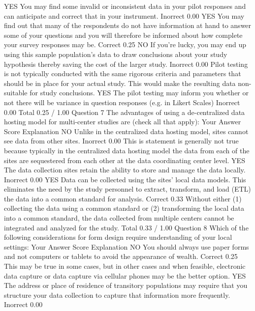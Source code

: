 YES You may find some invalid or inconsistent data in your pilot responses and can anticipate and correct that in your instrument.	Inorrect	0.00	
YES You may find out that many of the respondents do not have information at hand to answer some of your questions and you will therefore be informed about how complete your survey responses may be.	Correct	0.25	
NO If you're lucky, you may end up using this sample population's data to draw conclusions about your study hypothesis thereby saving the cost of the larger study.	Inorrect	0.00	Pilot testing is not typically conducted with the same rigorous criteria and parameters that should be in place for your actual study. This would make the resulting data non-suitable for study conclusions.
YES The pilot testing may inform you whether or not there will be variance in question responses (e.g. in Likert Scales)	Inorrect	0.00	
Total		0.25 / 1.00	
Question 7
The advantages of using a de-centralized data hosting model for multi-center studies are (check all that apply):
Your Answer		Score	Explanation
NO Unlike in the centralized data hosting model, sites cannot see data from other sites.	Inorrect	0.00	This is statement is generally not true because typically in the centralized data hosting model the data from each of the sites are sequestered from each other at the data coordinating center level.
YES The data collection sites retain the ability to store and manage the data locally.	Inorrect	0.00	
YES Data can be collected using the sites' local data models. This eliminates the need by the study personnel to extract, transform, and load (ETL) the data into a common standard for analysis.	Correct	0.33	Without either (1) collecting the data using a common standard or (2) transforming the local data into a common standard, the data collected from multiple centers cannot be integrated and analyzed for the study.
Total		0.33 / 1.00	
Question 8
Which of the following considerations for form design require understanding of your local settings:
Your Answer		Score	Explanation
NO You should always use paper forms and not computers or tablets to avoid the appearance of wealth.	Correct	0.25	This may be true in some cases, but in other cases and when feasible, electronic data capture or data capture via cellular phones may be the better option.
YES The address or place of residence of transitory populations may require that you structure your data collection to capture that information more frequently.	Inorrect	0.00	
